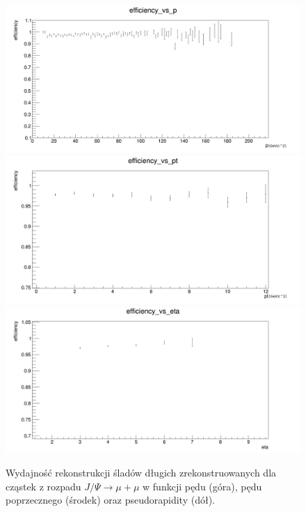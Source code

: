 \begin{figure}[H]
\centering
\includegraphics[scale=0.3]{rozdzial6/Jpsi_p.png} \\
\includegraphics[scale=0.3]{rozdzial6/Jpsi_pt.png} \\
\includegraphics[scale=0.3]{rozdzial6/Jpsi_eta.png} \\ 
\caption{Wydajność rekonstrukcji śladów długich zrekonstruowanych dla cząstek z rozpadu $J/\Psi \rightarrow \mu + \mu $  w funkcji pędu (góra), pędu poprzecznego (środek) oraz pseudorapidity (dół).}
\label{effJPsi}
\end{figure}



